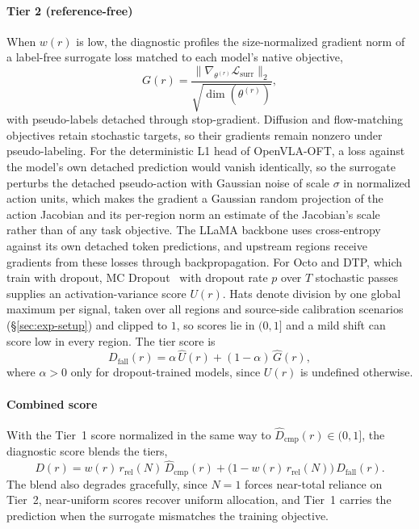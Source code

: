 \paragraph{Tier 2 (reference-free)}
When $w(r)$ is low, the diagnostic profiles the size-normalized gradient norm of a label-free surrogate loss matched to each model's native objective,
%
\begin{equation}
\label{eq:gradient-score}
    G(r) = \frac{\bigl\lVert \nabla_{\theta^{(r)}} \mathcal{L}_\text{surr} \bigr\rVert_2}{\sqrt{\dim(\theta^{(r)})}},
\end{equation}
%
with pseudo-labels detached through stop-gradient.
Diffusion and flow-matching objectives retain stochastic targets, so their gradients remain nonzero under pseudo-labeling.
For the deterministic L1 head of OpenVLA-OFT, a loss against the model's own detached prediction would vanish identically, so the surrogate perturbs the detached pseudo-action with Gaussian noise of scale $\sigma$ in normalized action units, which makes the gradient a Gaussian random projection of the action Jacobian and its per-region norm an estimate of the Jacobian's scale rather than of any task objective.
The LLaMA backbone uses cross-entropy against its own detached token predictions, and upstream regions receive gradients from these losses through backpropagation.
For Octo and DTP, which train with dropout, MC Dropout~\cite{Gal2016MCDropout} with dropout rate $p$ over $T$ stochastic passes supplies an activation-variance score $U(r)$.
Hats denote division by one global maximum per signal, taken over all regions and source-side calibration scenarios (\S\ref{sec:exp-setup}) and clipped to $1$, so scores lie in $(0, 1]$ and a mild shift can score low in every region.
The tier score is
%
\begin{equation}
\label{eq:tier2-score}
    D_\text{fall}(r) = \alpha\,\hat{U}(r) + (1 - \alpha)\,\hat{G}(r),
\end{equation}
%
where $\alpha > 0$ only for dropout-trained models, since $U(r)$ is undefined otherwise.

\paragraph{Combined score}
With the Tier~1 score normalized in the same way to $\hat{D}_\text{cmp}(r) \in (0, 1]$, the diagnostic score blends the tiers,
%
\begin{equation}
\label{eq:combined-score}
    D(r) = w(r)\, r_\text{rel}(N)\, \hat{D}_\text{cmp}(r)
         + \bigl(1 - w(r)\, r_\text{rel}(N)\bigr)\, D_\text{fall}(r).
\end{equation}
%
The blend also degrades gracefully, since $N = 1$ forces near-total reliance on Tier~2, near-uniform scores recover uniform allocation, and Tier~1 carries the prediction when the surrogate mismatches the training objective.

